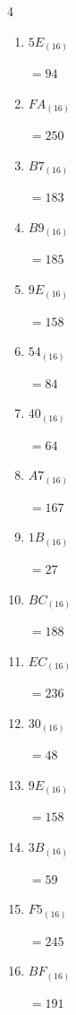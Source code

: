 \begin{multicols}{4}
\begin{enumerate}
  \item $5E_{(16)}$

        $=94$

\columnbreak %

  \item $FA_{(16)}$

        $=250$

  \item $B7_{(16)}$

        $=183$

  \item $B9_{(16)}$

        $=185$

  \item $9E_{(16)}$

        $=158$

  \item $54_{(16)}$

        $=84$

  \item $40_{(16)}$

        $=64$

  \item $A7_{(16)}$

        $=167$

  \item $1B_{(16)}$

        $=27$

  \item $BC_{(16)}$

        $=188$

  \item $EC_{(16)}$

        $=236$

  \item $30_{(16)}$

        $=48$

  \item $9E_{(16)}$

        $=158$

  \item $3B_{(16)}$

        $=59$

  \item $F5_{(16)}$

        $=245$

  \item $BF_{(16)}$

        $=191$

\columnbreak %


\end{enumerate}
\end{multicols}
